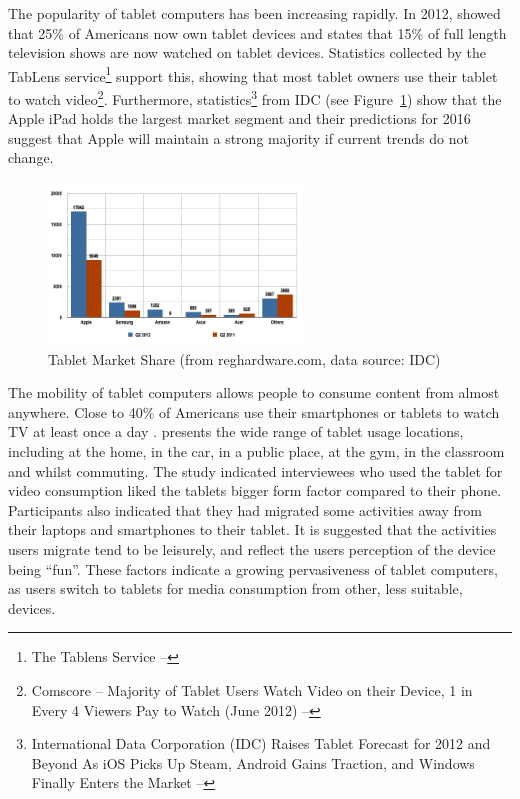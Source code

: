 	The popularity of tablet computers has been increasing rapidly. In 2012, \citet{pewResearch} showed that 25\% of Americans now own tablet devices and \citet{viacom} states that 15\% of full length television shows are now watched on tablet devices. Statistics collected by the TabLens service\footnote{The Tablens Service -- } support this, showing that most tablet owners use their tablet to watch video\footnote{Comscore -- Majority of Tablet Users Watch Video on their Device, 1 in Every 4 Viewers Pay to Watch (June 2012) -- }. Furthermore, statistics\footnote{International Data Corporation (IDC) Raises Tablet Forecast for 2012 and Beyond As iOS Picks Up Steam, Android Gains Traction, and Windows Finally Enters the Market -- } from IDC (see Figure~\ref{fig:tablet_market_share}) show that the Apple iPad holds the largest market segment and their predictions for 2016 suggest that Apple will maintain a strong majority if current trends do not change.

	\begin{figure}[ht]
		\centering
			\includegraphics[width=0.6\textwidth]{images/idcTabletMarketShare.png}
		\caption[Caption for LOF]{Tablet Market Share (from reghardware.com\footnotemark, data source: IDC)}
		\label{fig:tablet_market_share}
	\end{figure}

	The mobility of tablet computers allows people to consume content from almost anywhere. Close to 40\% of Americans use their smartphones or tablets to watch TV at least once a day \citep{state-of-media}. \citet{google-tablets} presents the wide range of tablet usage locations, including at the home, in the car, in a public place, at the gym, in the classroom and whilst commuting. The study indicated interviewees who used the tablet for video consumption liked the tablets bigger form factor compared to their phone. Participants also indicated that they had migrated some activities away from their laptops and smartphones to their tablet. It is suggested that the activities users migrate tend to be leisurely, and reflect the users perception of the device being ``fun''. These factors indicate a growing pervasiveness of tablet computers, as users switch to tablets for media consumption from other, less suitable, devices.

